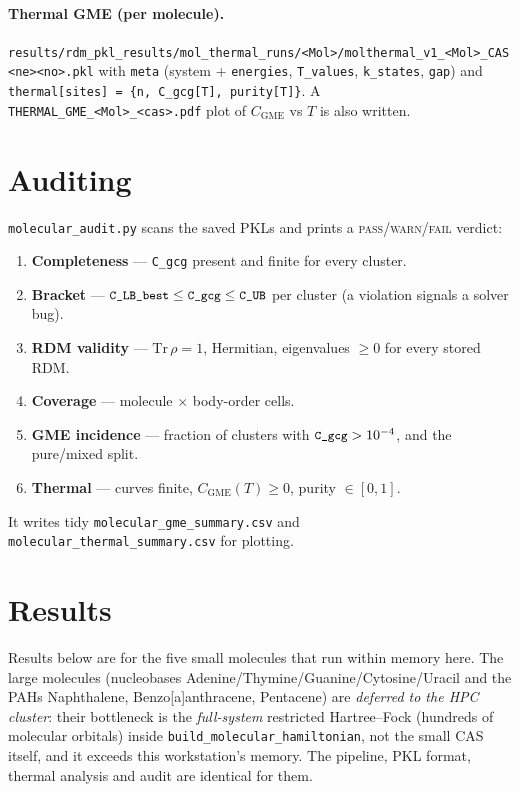 \documentclass[11pt]{article}
\newcommand{\code}[1]{\texttt{\small #1}}
\newcommand{\CGME}{\ensuremath{C_{\mathrm{GME}}}}
\begin{document}
\paragraph{Thermal GME (per molecule).}
\code{results/rdm\_pkl\_results/mol\_thermal\_runs/<Mol>/molthermal\_v1\_<Mol>\_CAS<ne><no>.pkl}
with \code{meta} (system + \code{energies}, \code{T\_values}, \code{k\_states},
\code{gap}) and \code{thermal[sites] = \{n, C\_gcg[T], purity[T]\}}. A
\code{THERMAL\_GME\_<Mol>\_<cas>.pdf} plot of \CGME{} vs $T$ is also written.

\section{Auditing}\label{sec:audit}
\code{molecular\_audit.py} scans the saved PKLs and prints a
\textsc{pass}/\textsc{warn}/\textsc{fail} verdict:
\begin{enumerate}[nosep]
  \item \textbf{Completeness} --- \code{C\_gcg} present and finite for every cluster.
  \item \textbf{Bracket} --- $\code{C\_LB\_best}\le\code{C\_gcg}\le\code{C\_UB}$
        per cluster (a violation signals a solver bug).
  \item \textbf{RDM validity} --- $\mathrm{Tr}\,\rho=1$, Hermitian, eigenvalues
        $\ge0$ for every stored RDM.
  \item \textbf{Coverage} --- molecule $\times$ body-order cells.
  \item \textbf{GME incidence} --- fraction of clusters with $\code{C\_gcg}>10^{-4}$,
        and the pure/mixed split.
  \item \textbf{Thermal} --- curves finite, $\CGME(T)\ge0$, purity $\in[0,1]$.
\end{enumerate}
It writes tidy \code{molecular\_gme\_summary.csv} and
\code{molecular\_thermal\_summary.csv} for plotting.

\section{Results}\label{sec:results}
Results below are for the five small molecules that run within memory here.
The large molecules (nucleobases Adenine/Thymine/Guanine/Cytosine/Uracil and the
PAHs Naphthalene, Benzo[a]anthracene, Pentacene) are \emph{deferred to the HPC
cluster}: their bottleneck is the \emph{full-system} restricted Hartree--Fock
(hundreds of molecular orbitals) inside \code{build\_molecular\_hamiltonian}, not
the small CAS itself, and it exceeds this workstation's memory. The pipeline,
PKL format, thermal analysis and audit are identical for them.
\end{document}
